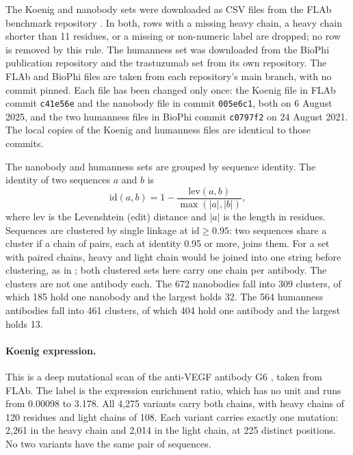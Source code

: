 The Koenig and nanobody sets were downloaded as CSV files from the FLAb benchmark repository \citep{Chungyoun2024}. In both, rows with a missing heavy chain, a heavy chain shorter than 11 residues, or a missing or non-numeric label are dropped; no row is removed by this rule. The humanness set was downloaded from the BioPhi publication repository and the trastuzumab set from its own repository. The FLAb and BioPhi files are taken from each repository's main branch, with no commit pinned. Each file has been changed only once: the Koenig file in FLAb commit \texttt{c41e56e} and the nanobody file in commit \texttt{005e6c1}, both on 6 August 2025, and the two humanness files in BioPhi commit \texttt{c0797f2} on 24 August 2021. The local copies of the Koenig and humanness files are identical to those commits.

The nanobody and humanness sets are grouped by sequence identity. The identity of two sequences $a$ and $b$ is
\begin{equation}
\mathrm{id}(a,b) = 1 - \frac{\mathrm{lev}(a,b)}{\max(|a|,|b|)},
\end{equation}
where $\mathrm{lev}$ is the Levenshtein (edit) distance and $|a|$ is the length in residues. Sequences are clustered by single linkage at $\mathrm{id} \ge 0.95$: two sequences share a cluster if a chain of pairs, each at identity 0.95 or more, joins them. For a set with paired chains, heavy and light chain would be joined into one string before clustering, as in \citet{Kenlay2024}; both clustered sets here carry one chain per antibody. The clusters are not one antibody each. The 672 nanobodies fall into 309 clusters, of which 185 hold one nanobody and the largest holds 32. The 564 humanness antibodies fall into 461 clusters, of which 404 hold one antibody and the largest holds 13.

\paragraph{Koenig expression.} This is a deep mutational scan of the anti-VEGF antibody G6 \citep{Koenig2017}, taken from FLAb. The label is the expression enrichment ratio, which has no unit and runs from 0.00098 to 3.178. All 4,275 variants carry both chains, with heavy chains of 120 residues and light chains of 108. Each variant carries exactly one mutation: 2,261 in the heavy chain and 2,014 in the light chain, at 225 distinct positions. No two variants have the same pair of sequences.

